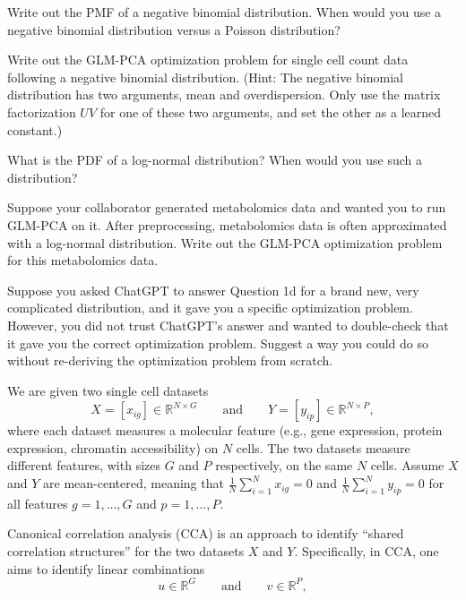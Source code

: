 \documentclass[12pt]{article}
\begin{document}
\makehomeworkheader
{}
\begin{subquestions}
\item Write out the PMF of a negative binomial distribution. When would you use a negative binomial distribution versus a Poisson distribution?

\item Write out the GLM-PCA optimization problem for single cell count data following a negative binomial distribution. (Hint: The negative binomial distribution has two arguments, mean and overdispersion. Only use the matrix factorization $UV$ for one of these two arguments, and set the other as a learned constant.)

\item What is the PDF of a log-normal distribution? When would you use such a distribution?

\item Suppose your collaborator generated metabolomics data and wanted you to run GLM-PCA on it. After preprocessing, metabolomics data is often approximated with a log-normal distribution. Write out the GLM-PCA optimization problem for this metabolomics data.

\item Suppose you asked ChatGPT to answer Question 1d for a brand new, very complicated distribution, and it gave you a specific optimization problem. However, you did not trust ChatGPT's answer and wanted to double-check that it gave you the correct optimization problem. Suggest a way you could do so without re-deriving the optimization problem from scratch.
\end{subquestions}
\newpage


We are given two single cell datasets
\begin{equation}
    X=[x_{ig}] \in \mathbb{R}^{N \times G} \qquad \text{and} \qquad Y=[y_{ip}] \in \mathbb{R}^{N \times P},
\end{equation}
where each dataset measures a molecular feature (e.g., gene expression, protein expression, chromatin accessibility) on $N$ cells. The two datasets measure different features, with sizes $G$ and $P$ respectively, on the same $N$ cells. Assume $X$ and $Y$ are mean-centered, meaning that $\frac{1}{N} \sum_{i=1}^N x_{ig} = 0$ and $\frac{1}{N} \sum_{i=1}^N y_{ip} = 0$ for all features $g=1,\dots,G$ and $p=1,\dots,P$.

Canonical correlation analysis (CCA) is an approach to identify ``shared correlation structures'' for the two datasets $X$ and $Y$. Specifically, in CCA, one aims to identify linear combinations
\begin{equation}
u \in \mathbb{R}^{G} \qquad \text{and} \qquad v \in \mathbb{R}^{P},
\end{equation}
\end{document}
